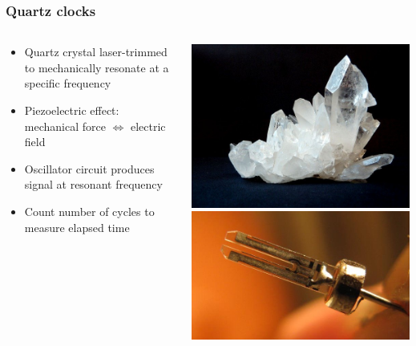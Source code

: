 \begin{frame}
    \label{s:quartz-clocks}
    \frametitle{Quartz clocks}
    \begin{columns}
        \begin{column}{0.5\textwidth}
            \begin{itemize}
                \item Quartz crystal laser-trimmed to mechanically resonate at a specific frequency
                \item Piezoelectric effect: mechanical force $\Leftrightarrow$ electric field
                \item Oscillator circuit produces signal at resonant frequency
                \item Count number of cycles to measure elapsed time
            \end{itemize}
        \end{column}
        \begin{column}{0.5\textwidth}
            \includegraphics[width=\textwidth]{images/quartz-crystal.jpg}\\[1em]
            \includegraphics[width=\textwidth]{images/quartz-tuningfork.jpg}
        \end{column}
    \end{columns}
\end{frame}
\label{l:quartz-clocks}

